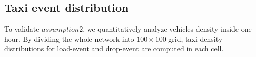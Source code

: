 \subsection{Taxi event distribution}
\label{section_taxi_denstiy_distribution}

To validate $assumption 2$, we quantitatively analyze vehicles density inside one hour. By dividing the whole network into $100 \times 100$ grid, taxi density distributions for load-event and drop-event are computed in each cell.


